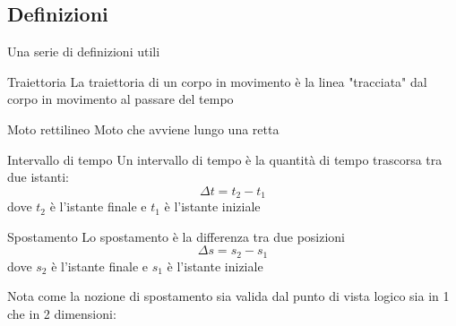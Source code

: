 \subsection{Definizioni}
Una serie di definizioni utili
\begin{definizione}{Traiettoria}
	La traiettoria di un corpo in movimento è la linea "tracciata" dal corpo in movimento al passare del tempo
\end{definizione}
\begin{definizione}{Moto rettilineo}
	Moto che avviene lungo una retta
\end{definizione}
\begin{definizione}{Intervallo di tempo}
	Un intervallo di tempo è la quantità di tempo trascorsa tra due istanti:
	\[
		\Delta t = t_2 - t_1
	\]
	dove $ t_2 $ è l'istante finale e $ t_1 $ è l'istante iniziale
\end{definizione}
\begin{definizione}{Spostamento}
	Lo spostamento è la differenza tra due posizioni
	\[
		\Delta s = s_2 - s_1
	\]
	dove $ s_2 $ è l'istante finale e $ s_1 $ è l'istante iniziale
\end{definizione}
Nota come la nozione di spostamento sia valida dal punto di vista logico sia in 1 che in 2 dimensioni:



\begin{minipage}[c]{0.48\textwidth}
\end{minipage}
%
\begin{minipage}[c]{0.48\textwidth}
\end{minipage}
